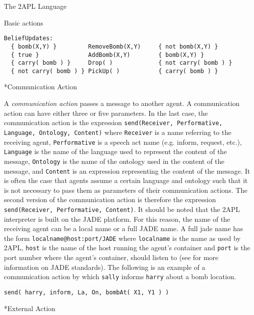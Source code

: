 \begin{chapter}{The 2APL Language}
\begin{section}{Basic actions}
\begin{subsection}
\begin{verbatim}
BeliefUpdates:
  { bomb(X,Y) }         RemoveBomb(X,Y)     { not bomb(X,Y) }
  { true }              AddBomb(X,Y)        { bomb(X,Y) }
  { carry( bomb ) }     Drop( )             { not carry( bomb ) }
  { not carry( bomb ) } PickUp( )           { carry( bomb ) }
\end{verbatim}

\end{subsection}

\begin{subsection}*{Communication Action}

A \emph{communication action} passes a message to another agent. A
communication action  can have either three or five
parameters. In the last case, the communication action is the
expression {\tt send(Receiver, Performative, Language, Ontology,
Content)} where {\tt Receiver} is a name referring to the receiving
agent, {\tt Performative} is a speech act name (e.g. inform,
request, etc.), {\tt Language} is the name of the language used to
represent the content of the message, {\tt Ontology} is the name of
the ontology used in the content of the message, and {\tt Content}
is an expression representing the content of the message. It is
often the case that agents assume a certain language and ontology
such that it is not necessary to pass them as parameters of their
communication actions. The second version of the communication
action is therefore the expression {\tt send(Receiver, Performative,
Content)}. It should be noted that the 2APL interpreter is built on
the JADE platform. For this reason, the name of the receiving agent
can be a local name or a full JADE name. A full jade name has the
form {\tt localname@host:port/JADE} where {\tt localname} is the
name as used by 2APL, {\tt host} is the name of the host running the
agent's container and {\tt port} is the port number where the
agent's container, should listen to (see \cite{jade2005} for more
information on JADE standards). The following is an example of a
communication action by which {\tt sally} informs {\tt harry} about
a bomb location.

\begin{verbatim}
send( harry, inform, La, On, bombAt( X1, Y1 ) )
\end{verbatim}

\end{subsection}


\begin{subsection}*{External Action}\label{sec:externalaction}


\end{subsection}
\end{section}
\end{chapter}
